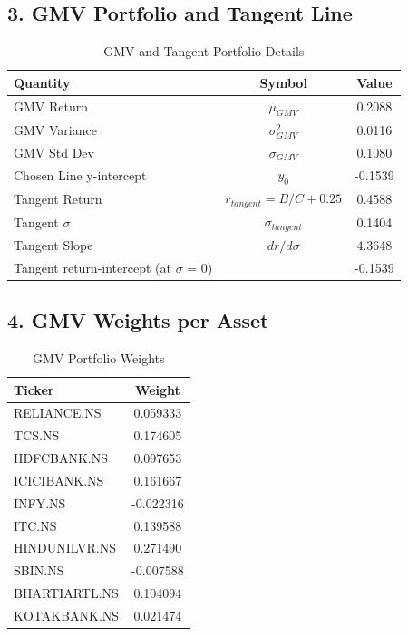 \subsection*{3. GMV Portfolio and Tangent Line}
\begin{table}[H]
    \centering
    \caption{GMV and Tangent Portfolio Details}
    \begin{tabular}{@{}lcc@{}}
        \toprule
        Quantity & Symbol & Value \\ 
        \midrule
        GMV Return & $\mu_{GMV}$ & 0.2088 \\
        GMV Variance & $\sigma^2_{GMV}$ & 0.0116 \\
        GMV Std Dev & $\sigma_{GMV}$ & 0.1080 \\
        Chosen Line y-intercept & $y_0$ & -0.1539 \\
        Tangent Return & $r_{tangent} = B/C + 0.25$ & 0.4588 \\
        Tangent $\sigma$ & $\sigma_{tangent}$ & 0.1404 \\
        Tangent Slope & $dr/d\sigma$ & 4.3648 \\
        Tangent return-intercept (at $\sigma$ = 0) & & -0.1539 \\ 
        \bottomrule
    \end{tabular}
\end{table}

\subsection*{4. GMV Weights per Asset}
\begin{table}[H]
    \centering
    \caption{GMV Portfolio Weights}
    \begin{tabular}{@{}lc@{}}
        \toprule
        Ticker & Weight \\ 
        \midrule
        RELIANCE.NS    & 0.059333 \\
        TCS.NS         & 0.174605 \\
        HDFCBANK.NS    & 0.097653 \\
        ICICIBANK.NS   & 0.161667 \\
        INFY.NS        & -0.022316 \\
        ITC.NS         & 0.139588 \\
        HINDUNILVR.NS  & 0.271490 \\
        SBIN.NS        & -0.007588 \\
        BHARTIARTL.NS  & 0.104094 \\
        KOTAKBANK.NS   & 0.021474 \\ 
        \bottomrule
    \end{tabular}
\end{table}


